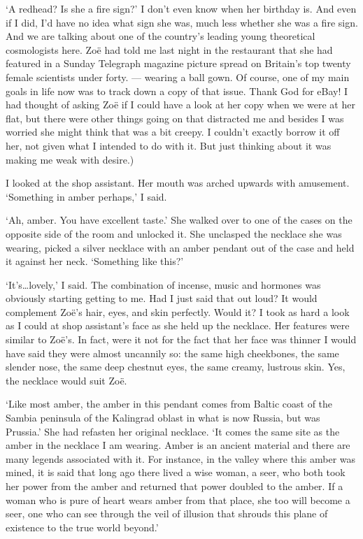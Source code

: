 `A redhead? Is she a fire sign?' I don't even know when her birthday
is. And even if I did, I'd have no idea what sign she was, much less
whether she was a fire sign. And we are talking about one of the
country's leading young theoretical {\twelveit cosmologists\/} here.
Zoë had told me last night in the restaurant that she had
featured in a {\twelvesl Sunday Telegraph\/} magazine picture spread
on Britain's top twenty female scientists under forty.
--- wearing a ball gown. Of course, one of my main goals in life now
was to track down a copy of that issue. Thank God for eBay! I had
thought of asking Zoë if I could have a look at her copy when we
were at her flat, but there were other things going on that
distracted me and besides I was worried she might think that was a bit creepy. I couldn't exactly borrow it off her, not given what I intended
to do with it. But just thinking about it was making me weak with
desire.)

I looked at the shop assistant. Her mouth was arched upwards with
amusement. `Something in amber perhaps,' I said.

`Ah, amber. You have excellent taste.' She walked over to one of the
cases on the opposite side of the room and unlocked it. She
unclasped the necklace she was wearing, picked a silver necklace
with an amber pendant out of the case and held it against her neck.
`Something like this?'

`It's\dots lovely,' I said. The combination of incense, music and
hormones was obviously starting getting to me. Had I just said that
out loud? It would complement Zoë's hair, eyes, and skin
perfectly. Would it? I took as hard a look as I could at shop
assistant's face as she held up the necklace. Her features were
similar to Zoë's. In fact, were it not for the fact that her
face was thinner I would have said they were almost uncannily so:
the same high cheekbones, the same slender nose, the same deep
chestnut eyes, the same creamy, lustrous skin. Yes, the necklace
would suit Zoë.

`Like most amber, the amber in this pendant comes from Baltic coast
of the Sambia peninsula of the Kalingrad oblast in what is now
Russia, but was Prussia.' She had refasten her original necklace.
`It comes the same site as the amber in the necklace I am wearing.
Amber is an ancient material and there are many legends associated
with it. For instance, in the valley where this amber was mined, it
is said that long ago there lived a wise woman, a seer, who both
took her power from the amber and returned that power doubled to the
amber. If a woman who is pure of heart wears amber from that place,
she too will become a seer, one who can see through the veil of
illusion that shrouds this plane of existence to the true world
beyond.'

